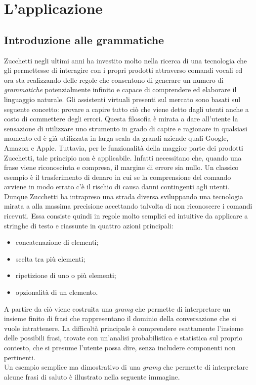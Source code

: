 
\chapter{L'applicazione}
\label{cap:applicazione}


\section{Introduzione alle grammatiche}
Zucchetti negli ultimi anni ha investito molto nella ricerca di una tecnologia che gli permettesse di interagire con i propri prodotti attraverso comandi vocali ed ora sta realizzando delle regole che consentono di generare un numero di \emph{grammatiche} potenzialmente infinito e capace di comprendere ed elaborare il linguaggio naturale.
Gli assistenti virtuali presenti sul mercato sono basati sul seguente concetto: provare a capire tutto ciò che viene detto dagli utenti anche a costo di commettere degli errori. Questa filosofia è mirata a dare all'utente la sensazione di utilizzare uno strumento in grado di capire e ragionare in qualsiasi momento ed è già utilizzata in larga scala da grandi aziende quali Google, Amazon e Apple. Tuttavia, per le funzionalità della maggior parte dei prodotti Zucchetti, tale principio non è applicabile. Infatti necessitano che, quando una frase viene riconosciuta e compresa, il margine di errore sia nullo. Un classico esempio è il trasferimento di denaro in cui se la comprensione del comando avviene in modo errato c'è il rischio di causa danni contingenti agli utenti. \\
Dunque Zucchetti ha intrapreso una strada diversa sviluppando una tecnologia mirata a alla massima precisione accettando talvolta di non riconoscere i comandi ricevuti. Essa consiste quindi in regole molto semplici ed intuitive da applicare a stringhe di testo e riassunte in quattro azioni principali:
\begin{itemize}
	\item concatenazione di elementi;
	\item scelta tra più elementi;
	\item ripetizione di uno o più elementi;
	\item opzionalità di un elemento.
\end{itemize}
A partire da ciò viene costruita una \emph{\gls{gramg}} che permette di interpretare un insieme finito di frasi che rappresentano il dominio della conversazione che si vuole intrattenere. La difficoltà principale è comprendere esattamente l'insieme delle possibili frasi, trovate con un'analisi probabilistica e statistica sul proprio contesto, che si presume l'utente possa dire, senza includere componenti non pertinenti. \\
Un esempio semplice ma dimostrativo di una \emph{\gls{gramg}} che permette di interpretare alcune frasi di saluto è illustrato nella seguente immagine.

